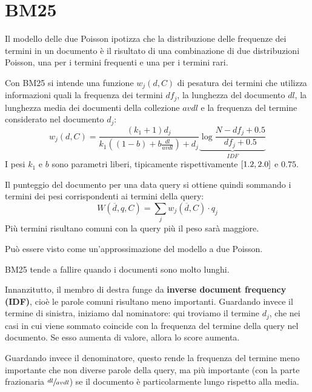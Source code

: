 \documentclass[\main/main.tex]{subfiles}
\begin{document}
\section{BM25}
\begin{definition}
    Il modello delle due Poisson ipotizza che la distribuzione delle frequenze dei termini in un documento è il risultato di una combinazione di due distribuzioni Poisson, una per i termini frequenti e una per i termini rari.
\end{definition}
\begin{definition}[BM25]
    Con BM25 si intende una funzione \(w_{j}(d, C)\) di pesatura dei termini che utilizza informazioni quali la frequenza dei termini \(df_{j}\), la lunghezza del documento \(dl\), la lunghezza media dei documenti della collezione \(avdl\) e la frequenza del termine considerato nel documento \(d_j\):
    \[
        w_{j}(d, C) =\frac{\left(k_{1}+1\right) d_{j}}{k_{1}\left((1-b)+b \frac{d l}{a v d l}\right)+d_{j}} \underbrace{\log \frac{N-d f_{j}+0.5}{d f_{j}+0.5}}_{IDF}
    \]
    I pesi \(k_1\) e \(b\) sono parametri liberi, tipicamente rispettivamente \(\left[1.2, 2.0\right]\) e \(0.75\).
    
    Il punteggio del documento per una data query si ottiene quindi sommando i termini dei pesi corrispondenti ai termini della query:
    \[
        W(\overline{d}, q, C)=\sum_{j} w_{j}(\overline{d}, C) \cdot q_{j}
    \]
    Più termini risultano comuni con la query più il peso sarà maggiore.
    
    Può essere visto come un'approssimazione del modello a due Poisson.
    
    BM25 tende a fallire quando i documenti sono molto lunghi.
\end{definition}
\begin{analysis}
    Innanzitutto, il membro di destra funge da \textbf{inverse document frequency (IDF)}, cioè le parole comuni risultano meno importanti. Guardando invece il termine di sinistra, iniziamo dal nominatore: qui troviamo il termine \(d_j\), che nei casi in cui viene sommato coincide con la frequenza del termine della query nel documento. Se esso aumenta di valore, allora lo score aumenta.
    
    Guardando invece il denominatore, questo rende la frequenza del termine meno importante che non diverse parole della query, ma più importante (con la parte frazionaria \(\sfrac{d l}{a v d l}\)) se il documento è particolarmente lungo rispetto alla media.
\end{analysis}
\end{document}
